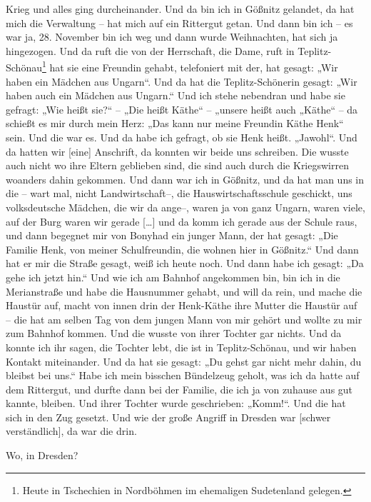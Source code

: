 \documentclass[ngerman,]{article}
\providecommand{\tightlist}{%
  \setlength{\itemsep}{0pt}\setlength{\parskip}{0pt}}
\begin{document}
\begin{multicols}{2}
\begin{description}
Krieg und alles ging durcheinander. Und da bin ich in Gößnitz gelandet,
da hat mich die Verwaltung – hat mich auf ein Rittergut getan. Und dann
bin ich – es war ja, 28. November bin ich weg und dann wurde
Weihnachten, hat sich ja hingezogen. Und da ruft die von der Herrschaft,
die Dame, ruft in Teplitz-Schönau\footnote{Heute in Tschechien in
  Nordböhmen im ehemaligen Sudetenland gelegen.} hat sie eine Freundin
gehabt, telefoniert mit der, hat gesagt: „Wir haben ein Mädchen aus
Ungarn“. Und da hat die Teplitz-Schönerin gesagt: „Wir haben auch ein
Mädchen aus Ungarn.“ Und ich stehe nebendran und habe sie gefragt: „Wie
heißt sie?“ – „Die heißt Käthe“ – „unsere heißt auch „Käthe“ – da
schießt es mir durch mein Herz: „Das kann nur meine Freundin Käthe Henk“
sein. Und die war es. Und da habe ich gefragt, ob sie Henk heißt.
„Jawohl“. Und da hatten wir {[}eine{]} Anschrift, da konnten wir beide
uns schreiben. Die wusste auch nicht wo ihre Eltern geblieben sind, die
sind auch durch die Kriegswirren woanders dahin gekommen. Und dann war
ich in Gößnitz, und da hat man uns in die – wart mal, nicht
Landwirtschaft–, die Hauswirtschaftsschule geschickt, uns volksdeutsche
Mädchen, die wir da ange–, waren ja von ganz Ungarn, waren viele, auf
der Burg waren wir gerade {[}\ldots{}{]} und da komm ich gerade aus der
Schule raus, und dann begegnet mir von Bonyhad ein junger Mann, der hat
gesagt: „Die Familie Henk, von meiner Schulfreundin, die wohnen hier in
Gößnitz.“ Und dann hat er mir die Straße gesagt, weiß ich heute noch.
Und dann habe ich gesagt: „Da gehe ich jetzt hin.“ Und wie ich am
Bahnhof angekommen bin, bin ich in die Merianstraße und habe die
Hausnummer gehabt, und will da rein, und mache die Haustür auf, macht
von innen drin der Henk-Käthe ihre Mutter die Haustür auf – die hat am
selben Tag von dem jungen Mann von mir gehört und wollte zu mir zum
Bahnhof kommen. Und die wusste von ihrer Tochter gar nichts. Und da
konnte ich ihr sagen, die Tochter lebt, die ist in Teplitz-Schönau, und
wir haben Kontakt miteinander. Und da hat sie gesagt: „Du gehst gar
nicht mehr dahin, du bleibst bei uns.“ Habe ich mein bisschen Bündelzeug
geholt, was ich da hatte auf dem Rittergut, und durfte dann bei der
Familie, die ich ja von zuhause aus gut kannte, bleiben. Und ihrer
Tochter wurde geschrieben: „Komm!“. Und die hat sich in den Zug gesetzt.
Und wie der große Angriff in Dresden war {[}schwer verständlich{]}, da
war die drin.
\end{description}

\begin{description}
\tightlist
\item[Ruth]
Wo, in Dresden?
\end{description}


\end{multicols}
\end{document}
